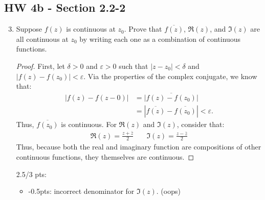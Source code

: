 \subsection*{HW 4b - Section 2.2-2}
\begin{enumerate}
\setcounter{enumi}{2}
\item Suppose $f(z)$ is continuous at $z_0$. Prove that $\overline{f(z)}$,  $\Re(z)$, and $\Im(z)$ are all continuous at $z_0$ by writing each one as a combination of continuous functions.
\begin{proof}
	First, let $\delta >0$ and $\varepsilon> 0$ such that $|z-z_0|<\delta$ and $|f(z)-f(z_0)|<\varepsilon$. \gline{}
		Via the properties of the complex conjugate, we know that:
		\begin{align*}
			|f(z)-f(z-0)|&=\overline{|f(z)-f(z_0)|}\\
			&=|\overline{f(z)}-\overline{f(z_0)}|<\varepsilon.
		\end{align*}
		Thus, $\overline{f(z_0)}$ is continuous. \gline{}
		For $\Re(z)$ and $\Im(z)$, consider that:
		\begin{align*}
			\Re(z) = \frac{z + \bar z}2 &\quad\Im(z) = \frac{z-\bar z}{2}
		\end{align*}
		Thus, because both the real and imaginary function are compositions of other continuous functions, they themselves are continuous. 
\end{proof}
\begin{grade}
	2.5/3 pts:
	\begin{itemize}[parsep=0pt, itemsep=0pt]
		\item -0.5pts: incorrect denominator for $\Im(z)$. (oops)
	\end{itemize}
\end{grade}


\end{enumerate}

